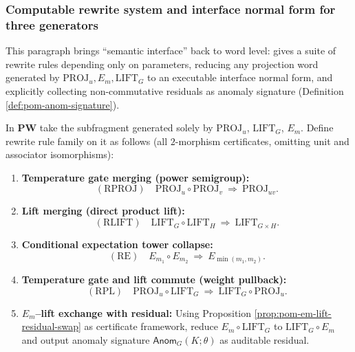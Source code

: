 \subsubsection{Computable rewrite system and interface normal form for three generators}\label{subsec:pom-three-gen-rewrite-normal}

This paragraph brings ``semantic interface'' back to word level: gives a suite of rewrite rules depending only on parameters, reducing any projection word generated by
\(\mathrm{PROJ}_u,E_m,\mathrm{LIFT}_G\)
to an executable interface normal form, and explicitly collecting non-commutative residuals as anomaly signature (Definition \ref{def:pom-anom-signature}).

\begin{definition}\label{def:pom-three-gen-rewrite-rules}
In $\mathbf{PW}$ take the subfragment generated solely by \(\mathrm{PROJ}_u\), \(\mathrm{LIFT}_G\), \(E_m\).
Define rewrite rule family on it as follows (all $2$-morphism certificates, omitting unit and associator isomorphisms):
\begin{enumerate}
  \item \textbf{Temperature gate merging (power semigroup):}
  $$
  (\mathrm{RPROJ})\quad
  \mathrm{PROJ}_u\circ \mathrm{PROJ}_v\ \Rightarrow\ \mathrm{PROJ}_{uv}.
  $$
  \item \textbf{Lift merging (direct product lift):}
  $$
  (\mathrm{RLIFT})\quad
  \mathrm{LIFT}_G\circ \mathrm{LIFT}_H\ \Rightarrow\ \mathrm{LIFT}_{G\times H}.
  $$
  \item \textbf{Conditional expectation tower collapse:}
  $$
  (\mathrm{RE})\quad
  E_{m_1}\circ E_{m_2}\ \Rightarrow\ E_{\min(m_1,m_2)}.
  $$
  \item \textbf{Temperature gate and lift commute (weight pullback):}
  $$
  (\mathrm{RPL})\quad
  \mathrm{PROJ}_u\circ \mathrm{LIFT}_G\ \Rightarrow\ \mathrm{LIFT}_G\circ \mathrm{PROJ}_u.
  $$
  \item \textbf{\(E_m\)--lift exchange with residual:}
  Using Proposition \ref{prop:pom-em-lift-residual-swap} as certificate framework, reduce \(E_m\circ\mathrm{LIFT}_G\) to \(\mathrm{LIFT}_G\circ E_m\) and output anomaly signature \(\mathsf{Anom}_G(K;\theta)\) as auditable residual.
\end{enumerate}
\end{definition}

